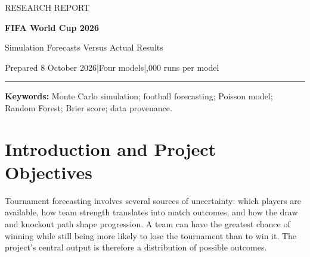 \documentclass[11pt,a4paper]{article}
\begin{document}
\thispagestyle{plain}
{\color{accent}\small RESEARCH REPORT}\par
\vspace{8pt}
{\LARGE\bfseries FIFA World Cup 2026\par}
\vspace{4pt}
{\Large Simulation Forecasts Versus Actual Results\par}
\vspace{8pt}
{\small Prepared 8 October 2026\quad|\quad Four models\quad|,000 runs per model}
\vspace{10pt}
\hrule


\begin{abstract}
This study develops and retrospectively evaluates a probabilistic simulation
framework for the FIFA World Cup 2026. The repository combines official squad
records, EAFC-style player ratings, public player statistics and national-team
strength priors to simulate complete tournaments. Three primary approaches are
compared: a Poisson baseline, a heuristic event simulator, and the same event
simulator augmented with a trained Random Forest. A legacy Random Forest run
is retained as a reference. Each saved forecast contains 10,000 tournament
realisations. Predictions are compared with FIFA's published outcomes using
stage-wise Brier scores, champion log loss and top-$k$ qualifier overlap.
Spain, the eventual champion, received title probabilities of 10.26\%, 18.18\%
and 17.11\% in the primary models, although none ranked Spain first. Heuristic
v2 achieved the lowest mean six-stage Brier score, 0.0840, compared with 0.0872
for the baseline and 0.0867 for Random Forest v2. Both v2 approaches ranked
Kylian Mbapp\'{e} first by expected goals. The analysis also identifies substantial
errors in Germany's and Brazil's projected advancement and in the prospects
of Norway and Morocco. Interpretation is limited by heterogeneous player-data
coverage, synthetic model training, and the absence of independently audited
pre-tournament publication timestamps. The results support the value of a
transparent simulation pipeline while motivating historical backtesting,
probability calibration and better source-version tracking.
\end{abstract}
\noindent\textbf{Keywords:} Monte Carlo simulation; football forecasting;
Poisson model; Random Forest; Brier score; data provenance.
\clearpage
\renewcommand{\contentsname}{Contents}
\tableofcontents
\clearpage
\listoffigures
\listoftables
\clearpage

\section{Introduction and Project Objectives}
\label{sec:introduction}
Tournament forecasting involves several sources of uncertainty: which players
are available, how team strength translates into match outcomes, and how the
draw and knockout path shape progression. A team can have the greatest chance
of winning while still being more likely to lose the tournament than to win it.
The project's central output is therefore a distribution of possible outcomes.
\end{document}
